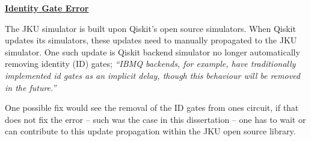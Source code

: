 \vspace{0.4cm}
\textbf{\underline{Identity Gate Error}}

The JKU simulator is built upon Qiskit's open source simulators. When Qiskit updates its simulators, these updates need to manually propagated to the JKU simulator. One such update is Qiskit backend simulator no longer automatically removing identity (ID) gates; \emph{``IBMQ backends, for example, have traditionally implemented id gates as an implicit delay, though this behaviour will be removed in the future.''} \citep{PersonalQiskit} 

One possible fix would see the removal of the ID gates from ones circuit, if that does not fix the error -- such was the case in this dissertation -- one has to wait or can contribute to this update propagation within the JKU open source library.

